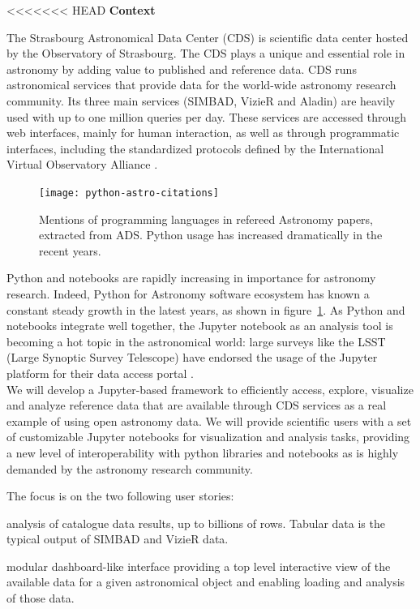 \begin{task}[
  title=Demonstrator: Astronomy,
  id=astro,
  lead=CDS,
  PM=18,
  wphases={18-42},
  partners={EGI,INSERM,QS,SRL,WTT,XFEL}
]

<<<<<<< HEAD
\textbf{Context}

  The Strasbourg Astronomical Data Center (CDS) is scientific data
  center hosted by the Observatory of Strasbourg. The CDS plays a unique and
  essential role in astronomy by adding value to published and reference data.
  CDS runs astronomical services that
  provide data for the world-wide astronomy research community. Its three main
  services (SIMBAD, VizieR and Aladin) are heavily used with up to one million
  queries per day.  These services are accessed through web interfaces, mainly
  for human interaction, as well as through programmatic interfaces, including
  the standardized protocols defined by the International Virtual Observatory
    Alliance \cite{ivoa}.

\begin{figure}[ht!]\centering
  \texttt{[image: python-astro-citations]}
  \caption{Mentions of programming languages in refereed Astronomy papers, extracted from ADS. Python usage has increased dramatically in the recent years.}\label{fig:python-astro-citations}
\end{figure}

  Python and notebooks are rapidly increasing in importance for astronomy
  research. Indeed, Python for Astronomy software ecosystem has known a
  constant steady growth in the latest years, as shown in
  figure~\ref{fig:python-astro-citations}. As Python and notebooks integrate
  well together, the Jupyter notebook as an analysis tool is becoming a hot
  topic in the astronomical world: large surveys like the LSST (Large Synoptic
  Survey Telescope) have endorsed the usage of the Jupyter platform for their
    data access portal \cite{lsst2017scienceplatform}.\\


  We will develop a Jupyter-based framework to efficiently access, explore,
  visualize and analyze reference data that are available through CDS services
  as a real example of using open astronomy data.
  We will provide scientific users with a set of customizable Jupyter notebooks
  for visualization and analysis tasks, providing a new level of
  interoperability with python libraries and notebooks as is highly demanded
  by the astronomy research community.

  The focus is on the two following user stories:
    \begin{compactitem}
        \item analysis of catalogue data results, up to billions of rows.
              Tabular data is the typical output of SIMBAD and VizieR data.
        \item modular dashboard-like interface providing a top level
              interactive view of the available data for a given astronomical
              object and enabling loading and analysis of those data.
    \end{compactitem}



\end{task}
